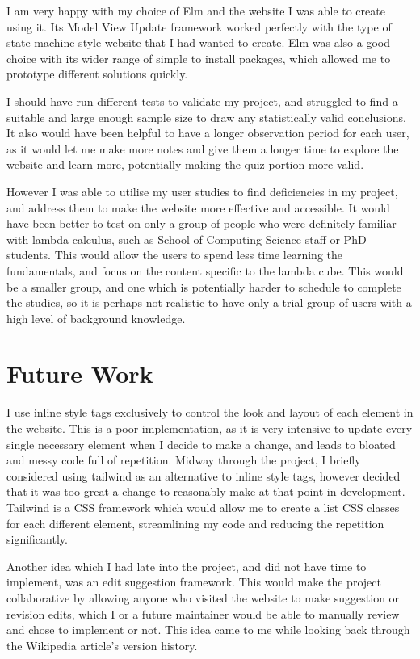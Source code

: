 \documentclass{l4proj}
\begin{document}
I am very happy with my choice of Elm and the website I was able to create using it.  Its Model  View Update framework worked perfectly with the type of state machine style website that I had wanted to create.  Elm was also a good choice with its wider range of simple to install packages, which allowed me to prototype different solutions quickly.

I should have run different tests to validate my project, and struggled to find a suitable and large enough sample size to draw any statistically valid conclusions.  It also would have been helpful to have a longer observation period for each user, as it would let me make more notes and give them a longer time to explore the website and learn more, potentially making the quiz portion more valid.  

However I was able to utilise my user studies to find deficiencies in my project, and address them to make the website more effective and accessible.  It would have been better to test on only a group of people who were definitely familiar with lambda calculus, such as School of Computing Science staff or PhD students.  This would allow the users to spend less time learning the fundamentals, and focus on the content specific to the lambda cube.  This would be a smaller group, and one which is potentially harder to schedule to complete the studies, so it is perhaps not realistic to have only a trial group of users with a high level of background knowledge.

\section{Future Work}

I use inline style tags exclusively to control the look and layout of each element in the website.  This is a poor implementation, as it is very intensive to update every single necessary element when I decide to make a change, and leads to bloated and messy code full of repetition.  Midway through the project, I briefly considered using tailwind as an alternative to inline style tags, however decided that it was too great a change to reasonably make at that point in development. Tailwind is a CSS framework which would allow me to create a list CSS classes for each different element, streamlining my code and reducing the repetition significantly. 

Another idea which I had late into the project, and did not have time to implement, was an edit suggestion framework.  This would make the project collaborative by allowing anyone who visited the website to make suggestion or revision edits, which I or a future maintainer would be able to manually review and chose to implement or not.  This idea came to me while looking back through the Wikipedia article's version history.
\end{document}
